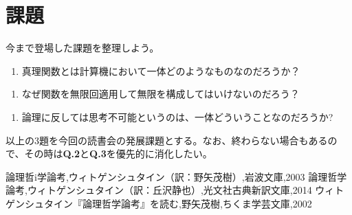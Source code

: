 \documentclass[11pt,a4paper,onecolumn,article]{jarticle}
\newcounter{ct}               %
\begin{document}
\section{課題}

今まで登場した課題を整理しよう。

\setcounter{ct}{1}
\begin{enumerate}
  \item 真理関数とは計算機において一体どのようなものなのだろうか？
\end{enumerate}

\begin{enumerate}
  \item なぜ関数を無限回適用して無限を構成してはいけないのだろう？
\end{enumerate}

\begin{enumerate}
  \item 論理に反しては思考不可能というのは、一体どういうことなのだろうか?
\end{enumerate}

以上の3題を今回の読書会の発展課題とする。なお、終わらない場合もあるので、その時は{\bf{Q.2}}と{\bf{Q.3}}を優先的に消化したい。


\begin{thebibliography}{9}
   論理哲i学論考,ウィトゲンシュタイン（訳：野矢茂樹）,岩波文庫,2003
   論理哲学論考,ウィトゲンシュタイン（訳：丘沢静也）,光文社古典新訳文庫,2014
   ウィトゲンシュタイン『論理哲学論考』を読む,野矢茂樹,ちくま学芸文庫,2002
\end{thebibliography}
\end{document}
